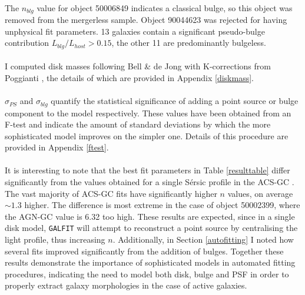 \documentclass[11pt,twocolumn]{article}
\begin{document}
\paragraph{} The $n_{blg}$ value for object 50006849 indicates a classical bulge, so this object was removed from the mergerless sample. Object 90044623 was rejected for having unphysical fit parameters. 13 galaxies contain a significant pseudo-bulge contribution $L_{blg}/L_{host} > 0.15$, the other 11 are predominantly bulgeless. 
\paragraph{} I computed disk masses following Bell \& de Jong \cite{2001ApJ...550..212B} with K-corrections from Poggianti \cite{1997AAS..122..399P} , the details of which are provided in Appendix \ref{diskmass}. 
\paragraph{} $\sigma_{PS}$ and $\sigma_{blg}$ quantify the statistical significance of adding a point source or bulge component to the model respectively. These values have been obtained from an F-test and indicate the amount of standard deviations by which the more sophisticated model improves on the simpler one. Details of this procedure are provided in Appendix \ref{ftest}.


\paragraph{} It is interesting to note that the best fit parameters in Table \ref{resulttable} differ significantly from the values obtained  for a single S\'{e}rsic profile in the ACS-GC \cite{2012ApJS..200....9G}. The vast majority of ACS-GC fits have significantly higher $n$ values, on average $\sim 1.3$ higher. The difference is most extreme in the case of object 50002399, where the AGN-GC value is 6.32 too high.  These results are expected, since in a single disk model, {\tt GALFIT} will attempt to reconstruct a point source by centralising the light profile, thus increasing $n$. Additionally, in Section \ref{autofitting} I noted how several fits improved significantly from the addition of bulges. Together these results demonstrate the importance of sophisticated models in automated fitting procedures, indicating the need to model both disk, bulge and PSF in order to properly extract galaxy morphologies in the case of active galaxies. 
\end{document}
